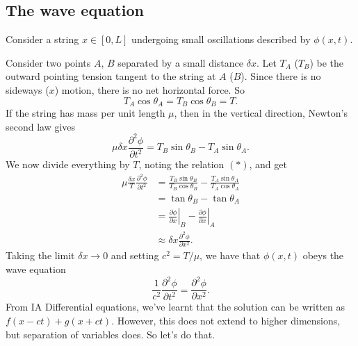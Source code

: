 \documentclass[a4paper]{article}
\begin{document}
\subsection{The wave equation}
Consider a string $x\in [0, L]$ undergoing small oscillations described by $\phi(x, t)$.
\begin{center}
\end{center} %
Consider two points $A$, $B$ separated by a small distance $\delta x$. Let $T_A$ ($T_B$) be the  outward pointing tension tangent to the string at $A$ ($B$). Since there is no sideways ($x$) motion, there is no net horizontal force. So
\[
  T_A\cos \theta_A = T_B \cos \theta_B = T.\tag{$*$}
\]
If the string has mass per unit length $\mu$, then in the vertical direction, Newton's second law gives
\[
  \mu \delta x \frac{\partial^2 \phi}{\partial t^2} = T_B \sin \theta_B - T_A \sin \theta_A.
\]
We now divide everything by $T$, noting the relation $(*)$, and get
\begin{align*}
  \mu \frac{\delta x}{T}\frac{\partial^2 \phi}{\partial t^2} &= \frac{T_B \sin \theta_B}{T_B\cos \theta_B} - \frac{T_A \sin \theta_A}{T_A \cos \theta_A}\\
  &= \tan \theta_B - \tan \theta_A\\
  &= \left.\frac{\partial\phi}{\partial x}\right|_B - \left.\frac{\partial\phi}{\partial x}\right|_A\\
  &\approx \delta x\frac{\partial^2 \phi}{\partial x^2}.
\end{align*}
Taking the limit $\delta x \to 0$ and setting $c^2 = T/\mu$, we have that $\phi(x, t)$ obeys the wave equation
\[
  \frac{1}{c^2} \frac{\partial^2 \phi}{\partial t^2} = \frac{\partial^2 \phi}{\partial x^2}.
\]
From IA Differential equations, we've learnt that the solution can be written as $f(x - ct) + g(x + ct)$. However, this does not extend to higher dimensions, but separation of variables does. So let's do that.
\end{document}
